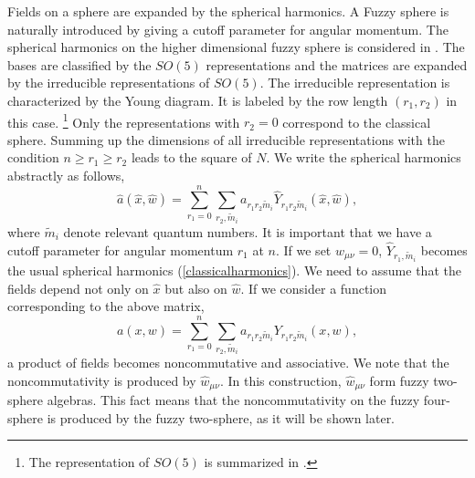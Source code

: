 \documentclass[a4paper,11pt]{article}
\begin{document}
Fields on a sphere are expanded by the spherical harmonics. 
A Fuzzy sphere is naturally introduced by giving 
a cutoff parameter for angular momentum. 
The spherical harmonics on the 
higher dimensional fuzzy sphere is considered in 
\cite{ramgoo,chenhou}. 
The bases are classified by the $SO(5)$ representations 
and the matrices are expanded by the irreducible 
representations of $SO(5)$. 
The irreducible representation is characterized by the Young diagram. 
It is labeled by the row length $(r_{1},r_{2})$ 
in this case. \footnote{
The representation of $SO(5)$ is summarized in \cite{ramgoo}.}
Only the representations with $r_{2}=0$ correspond to 
the classical sphere.
Summing up the dimensions of all irreducible representations 
with the condition $n\geq r_{1} \geq r_{2}$ leads 
to the square of $N$. 
We write the spherical harmonics abstractly as follows, 
\begin{equation} 
\hat{a}(\hat{x},\hat{w})=\sum_{r_{1}=0}^{n}
\sum_{r_{2},\tilde{m}_{i}} 
a_{r_{1}r_{2}\tilde{m}_{i}}
\hat{Y}_{r_{1}r_{2}\tilde{m}_{i}}(\hat{x},\hat{w}), 
\end{equation} 
where $\tilde{m}_{i}$ denote relevant quantum numbers. 
It is important that we have a cutoff parameter for 
angular momentum $r_{1}$ at $n$\cite{ramgoo}. 
If we set $w_{\mu\nu}=0$, 
$\hat{Y}_{r_{1},\tilde{m}_{i}}$ becomes 
the usual spherical harmonics (\ref{classicalharmonics}). 
We need to assume that the fields 
depend not only on $\hat{x}$ but also on $\hat{w}$. 
If we consider a function corresponding to 
the above matrix, 
\begin{equation} 
a(x,w)=\sum_{r_{1}=0}^{n}\sum_{r_{2},\tilde{m}_{i}}
a_{r_{1}r_{2}\tilde{m}_{i}}
Y_{r_{1}r_{2}\tilde{m}_{i}}(x,w), 
\end{equation} 
a product of fields becomes noncommutative 
and associative. 
We note that the noncommutativity is produced by $\hat{w}_{\mu\nu}$. 
In this construction, 
$\hat{w}_{\mu\nu}$ form fuzzy two-sphere algebras. 
This fact means that the noncommutativity 
on the fuzzy four-sphere 
is produced by the fuzzy two-sphere, as 
it will be shown later.  
\end{document}
